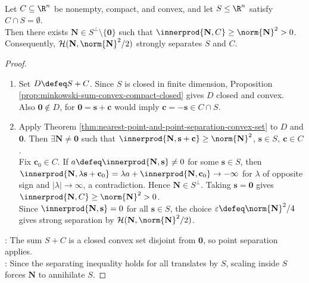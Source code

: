 \begin{theorem} \label{thm:compact-convex-set-separated-from-subspace} \\
Let $C\subseteq\R^n$ be nonempty, compact, and convex, and let $S\leq\R^n$ satisfy $C\cap S=\emptyset$.\\
Then there exists $\mathbf{N}\in S^\perp\setminus\{\mathbf{0}\}$ such that $\innerprod{\mathbf{N},C}\geq\norm{\mathbf{N}}^2>0$.\\
Consequently, $\mathcal{H}(\mathbf{N},\norm{\mathbf{N}}^2/2)$ strongly separates $S$ and $C$.
\begin{proof}
\begin{enumerate}[label=(\roman*)]
\setlength{\itemsep}{0pt}
\item Set $D\defeq S+C$. Since $S$ is closed in finite dimension, Proposition \ref{prop:minkowski-sum-convex-compact-closed} gives $D$ closed and convex.\\
Also $\mathbf{0}\notin D$, for $\mathbf{0}=\mathbf{s}+\mathbf{c}$ would imply $\mathbf{c}=-\mathbf{s}\in C\cap S$.
\item Apply Theorem \ref{thm:nearest-point-and-point-separation-convex-set} to $D$ and $\mathbf{0}$. Then $\exists\mathbf{N}\neq\mathbf{0}$ such that $\innerprod{\mathbf{N},\mathbf{s}+\mathbf{c}}\geq\norm{\mathbf{N}}^2$, $\mathbf{s}\in S,\ \mathbf{c}\in C$.\\
Fix $\mathbf{c}_0\in C$. If $a\defeq\innerprod{\mathbf{N},\mathbf{s}}\neq0$ for some $\mathbf{s}\in S$, then $\innerprod{\mathbf{N},\lambda\mathbf{s}+\mathbf{c}_0}=\lambda a+\innerprod{\mathbf{N},\mathbf{c}_0}\to-\infty$ for $\lambda$ of opposite sign and $|\lambda|\to\infty$, a contradiction. Hence $\mathbf{N}\in S^\perp$. Taking $\mathbf{s}=\mathbf{0}$ gives $\innerprod{\mathbf{N},C}\geq\norm{\mathbf{N}}^2>0$.\\
Since $\innerprod{\mathbf{N},\mathbf{s}}=0$ for all $\mathbf{s}\in S$, the choice $\varepsilon\defeq\norm{\mathbf{N}}^2/4$ gives strong separation by $\mathcal{H}(\mathbf{N},\norm{\mathbf{N}}^2/2)$.
\end{enumerate}
: The sum $S+C$ is a closed convex set disjoint from $\mathbf{0}$, so point separation applies.\\
: Since the separating inequality holds for all translates by $S$, scaling inside $S$ forces $\mathbf{N}$ to annihilate $S$.
\end{proof}
\end{theorem}


